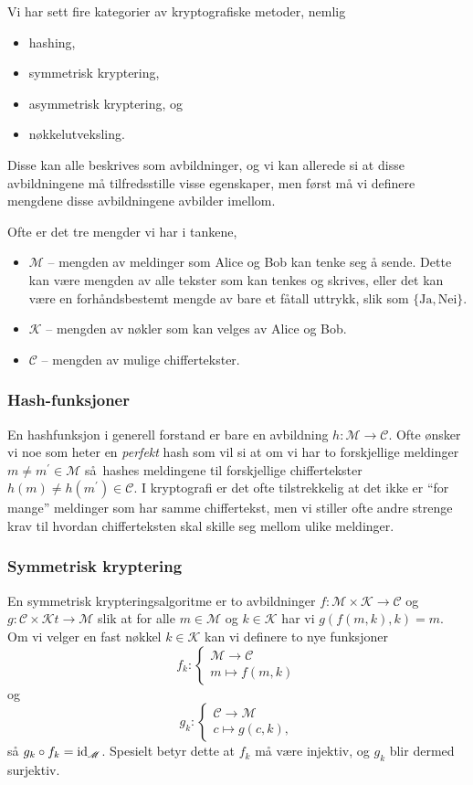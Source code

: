 Vi har sett fire kategorier av kryptografiske metoder,
nemlig
\begin{itemize}
    \item hashing,
    \item symmetrisk kryptering,
    \item asymmetrisk kryptering, og
    \item nøkkelutveksling.
\end{itemize}
Disse kan alle beskrives som avbildninger,
og vi kan allerede si at disse avbildningene må tilfredsstille visse egenskaper,
men først må vi definere mengdene disse avbildningene avbilder imellom.

Ofte er det tre mengder vi har i tankene,
\begin{itemize}
    \item $\mathscr M$ -- mengden av meldinger som Alice og Bob kan tenke seg å
        sende.
        Dette kan være mengden av alle tekster som kan tenkes og skrives,
        eller det kan være en forhåndsbestemt mengde av bare et fåtall uttrykk,
        slik som $\{\mathrm{Ja}, \mathrm{Nei}\}$.
    \item $\mathscr K$ -- mengden av nøkler som kan velges av Alice og Bob.
    \item $\mathscr C$ -- mengden av mulige chiffertekster.
\end{itemize}

\subsubsection{Hash-funksjoner}
En hashfunksjon i generell forstand er bare en avbildning $h\colon \mathscr M\to \mathscr C$.
Ofte ønsker vi noe som heter en \textit{perfekt} hash som vil si at om vi har to forskjellige
meldinger $m\neq m^\prime\in \mathscr M$ så hashes meldingene til forskjellige
chiffertekster $h(m)\neq h(m^\prime)\in \mathscr C$.
I kryptografi er det ofte tilstrekkelig at det ikke er ``for mange'' meldinger
som har samme chiffertekst,
men vi stiller ofte andre strenge krav til hvordan chifferteksten skal
skille seg mellom ulike meldinger.

\subsubsection{Symmetrisk kryptering}
En symmetrisk krypteringsalgoritme er to avbildninger
$f\colon \mathscr M\times \mathscr K\to \mathscr C$
og $g\colon \mathscr C\times \mathscr Kt\to \mathscr M$
slik at for alle $m\in \mathscr M$ og $k\in \mathscr K$
har vi $g(f(m, k),k) = m$.
Om vi velger en fast nøkkel $k\in \mathscr K$ kan vi definere
to nye funksjoner
\[
    f_k\colon \begin{cases}
        \mathscr M\to \mathscr C
        \\
        m\mapsto f(m, k)
    \end{cases}
\]
og
\[
    g_k\colon \begin{cases}
        \mathscr C\to \mathscr M
        \\
        c\mapsto g(c, k),
    \end{cases}
\]
så $g_k\circ f_k = \operatorname{id}_{\mathscr M}$.
Spesielt betyr dette at $f_k$ må være injektiv,
og $g_k$ blir dermed surjektiv.

